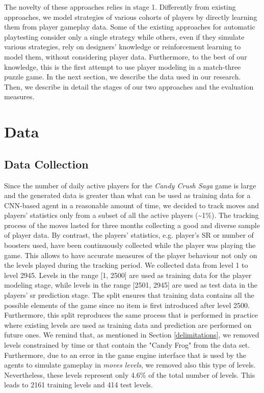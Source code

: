  The novelty of these approaches relies in stage 1. Differently from existing approaches, we model strategies of various cohorts of players by directly learning them from player gameplay data. Some of the existing approaches for automatic playtesting consider only a single strategy while others, even if they simulate various strategies, rely on designers' knowledge or reinforcement learning to model them, without considering player data. Furthermore, to the best of our knowledge, this is the first attempt to use player modeling in a match-three puzzle game. In the next section, we describe the data used in our research. Then, we describe in detail the stages of our two approaches and the evaluation measures.
 
\section{Data}
\subsection{Data Collection}
Since the number of daily active players for the \textit{Candy Crush Saga} game is large and the generated data is greater than what can be used as training data for a \acs{CNN}-based agent in a reasonable amount of time, we decided to track moves and players' statistics only from a subset of all the active players (\textasciitilde1\%). The tracking process of the moves lasted for three months collecting a good and diverse sample of player data. By contrast, the players' statistics, e.g. player's SR or number of boosters used, have been continuously collected while the player was playing the game. This allows to have accurate measures of the player behaviour not only on the levels played during the tracking period.
We collected data from level 1 to level 2945. Levels in the range [1, 2500] are used as training data for the player modeling stage, while levels in the range [2501, 2945] are used as test data in the players' \acs{sr} prediction stage. The split ensures that training data contains all the possible elements of the game since no item is first introduced after level 2500. Furthermore, this split reproduces the same process that is performed in practice where existing levels are used as training data and prediction are performed on future ones. We remind that, as mentioned in Section \ref{delimitations}, we removed levels constrained by time or that contain the "Candy Frog" from the data set. Furthermore, due to an error in the game engine interface that is used by the agents to simulate gameplay in \textit{moves levels}, we removed also this type of levels. Nevertheless, these levels represent only 4.6\% of the total number of levels. This leads to 2161 training levels and 414 test levels.

